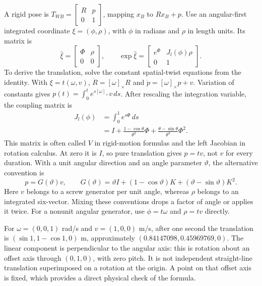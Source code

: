 A rigid pose is $T_{WB}=\begin{bmatrix}R&p\\0&1\end{bmatrix}$, mapping $x_B$ to $Rx_B+p$. Use an angular-first integrated coordinate $\xi=(\phi,\rho)$, with $\phi$ in radians and $\rho$ in length units. Its matrix is
\begin{equation}
 \widehat\xi=\begin{bmatrix}\Phi&\rho\\0&0\end{bmatrix},\qquad
 \exp\widehat\xi=
 \begin{bmatrix}e^\Phi&J_l(\phi)\rho\\0&1\end{bmatrix}.
 \label{eq:exponential_se3_block}
\end{equation}
To derive the translation, solve the constant spatial-twist equations from the identity. With $\xi=t(\omega,v)$, $\dot R=[\omega]_\times R$ and $\dot p=[\omega]_\times p+v$. Variation of constants gives $p(t)=\int_0^t e^{s[\omega]_\times}v\,ds$. After rescaling the integration variable, the coupling matrix is
\begin{equation}
 \begin{aligned}
 J_l(\phi)&=\int_0^1 e^{s\Phi}\,ds\\
 &=I+\frac{1-\cos\theta}{\theta^2}\Phi
      +\frac{\theta-\sin\theta}{\theta^3}\Phi^2.
 \end{aligned}
 \label{eq:v_matrix}
\end{equation}
This matrix is often called $V$ in rigid-motion formulas and the left Jacobian in rotation calculus. At zero it is $I$, so pure translation gives $p=t v$, not $v$ for every duration. With a unit angular direction and an angle parameter $\vartheta$, the alternative convention is
\begin{equation}
 p=G(\vartheta)v,\qquad
 G(\vartheta)=\vartheta I+(1-\cos\vartheta)K
                       +(\vartheta-\sin\vartheta)K^2.
 \label{eq:v_matrix_simple}
\end{equation}
Here $v$ belongs to a screw generator per unit angle, whereas $\rho$ belongs to an integrated six-vector. Mixing these conventions drops a factor of angle or applies it twice. For a nonunit angular generator, use $\phi=t\omega$ and $\rho=t v$ directly.

For $\omega=(0,0,1)$ rad/s and $v=(1,0,0)$ m/s, after one second the translation is $(\sin1,1-\cos1,0)$ m, approximately $(0.84147098,0.45969769,0)$. The linear component is perpendicular to the angular axis: this is rotation about an offset axis through $(0,1,0)$, with zero pitch. It is not independent straight-line translation superimposed on a rotation at the origin. A point on that offset axis is fixed, which provides a direct physical check of the formula.

